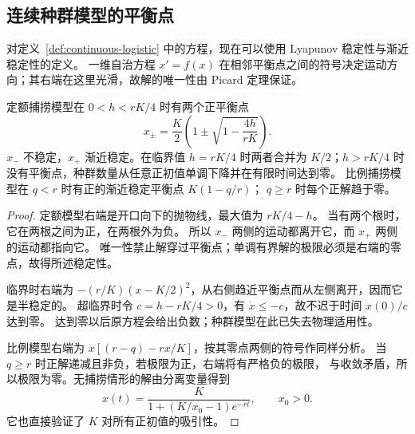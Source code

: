 \subsection*{连续种群模型的平衡点}
对定义~\ref{def:continuous-logistic} 中的方程，现在可以使用 Lyapunov 稳定性与渐近稳定性的定义。
一维自治方程 $x'=f(x)$ 在相邻平衡点之间的符号决定运动方向；其右端在这里光滑，故解的唯一性由 Picard 定理保证。
\begin{proposition}[捕捞阈值]\label{prop:harvest-threshold}
定额捕捞模型在 $0<h<rK/4$ 时有两个正平衡点
\[
 x_\pm=\frac K2\left(1\pm\sqrt{1-\frac{4h}{rK}}\right).
\]
$x_-$ 不稳定，$x_+$ 渐近稳定。在临界值 $h=rK/4$ 时两者合并为
$K/2$；$h>rK/4$ 时没有平衡点，种群数量从任意正初值单调下降并在有限时间达到零。
比例捕捞模型在 $q<r$ 时有正的渐近稳定平衡点 $K(1-q/r)$；
$q\geq r$ 时每个正解趋于零。
\end{proposition}
\begin{proof}
定额模型右端是开口向下的抛物线，最大值为 $rK/4-h$。
当有两个根时，它在两根之间为正，在两根外为负。
所以 $x_-$ 两侧的运动都离开它，而 $x_+$ 两侧的运动都指向它。
唯一性禁止解穿过平衡点；单调有界解的极限必须是右端的零点，故得所述稳定性。

临界时右端为 $-(r/K)(x-K/2)^2$，从右侧趋近平衡点而从左侧离开，因而它是半稳定的。
超临界时令 $c=h-rK/4>0$，有 $\dot x\leq-c$，故不迟于时间 $x(0)/c$ 达到零。
达到零以后原方程会给出负数；种群模型在此已失去物理适用性。

比例模型右端为 $x[(r-q)-rx/K]$，按其零点两侧的符号作同样分析。
当 $q\geq r$ 时正解递减且非负，若极限为正，右端将有严格负的极限，
与收敛矛盾，所以极限为零。无捕捞情形的解由分离变量得到
\[
 x(t)=\frac{K}{1+(K/x_0-1)e^{-rt}},\qquad x_0>0.
\]
它也直接验证了 $K$ 对所有正初值的吸引性。
\end{proof}
